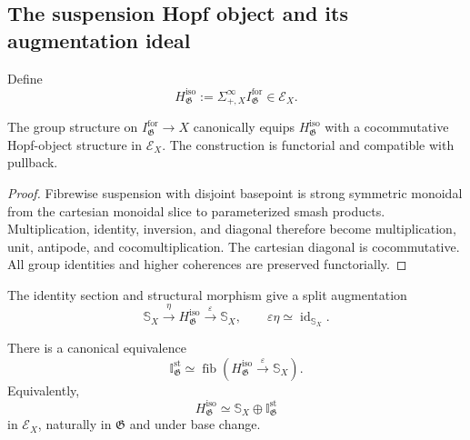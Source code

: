 \subsection{The suspension Hopf object and its augmentation ideal}

\begin{definition}
\label{def:bnla-isotropy-hopf}
Define
\[
    H^{\mathrm{iso}}_{\mathfrak G}
    :=
    \Sigma^\infty_{+,X}
    I^{\mathrm{for}}_{\mathfrak G}
    \in\mathcal E_X.
\]
\end{definition}

\begin{proposition}
\label{prop:bnla-isotropy-hopf}
The group structure on $I^{\mathrm{for}}_{\mathfrak G}\to X$ canonically
equips $H^{\mathrm{iso}}_{\mathfrak G}$ with a cocommutative Hopf-object
structure in $\mathcal E_X$.  The construction is functorial and compatible
with pullback.
\end{proposition}

\begin{proof}
Fibrewise suspension with disjoint basepoint is strong symmetric monoidal from
the cartesian monoidal slice to parameterized smash products.  Multiplication,
identity, inversion, and diagonal therefore become multiplication, unit,
antipode, and cocomultiplication.  The cartesian diagonal is cocommutative.
All group identities and higher coherences are preserved functorially.
\end{proof}

The identity section and structural morphism give a split augmentation
\[
    \mathbb S_X
    \xrightarrow{\eta}
    H^{\mathrm{iso}}_{\mathfrak G}
    \xrightarrow{\varepsilon}
    \mathbb S_X,
    \qquad
    \varepsilon\eta\simeq\operatorname{id}_{\mathbb S_X}.
\]

\begin{theorem}
\label{thm:bnla-isotropy-augmentation-ideal}
There is a canonical equivalence
\[
    \boxed{
    \mathbb I^{\mathrm{st}}_{\mathfrak G}
    \simeq
    \operatorname{fib}
    \left(
        H^{\mathrm{iso}}_{\mathfrak G}
        \xrightarrow{\varepsilon}
        \mathbb S_X
    \right).}
\]
Equivalently,
\[
    H^{\mathrm{iso}}_{\mathfrak G}
    \simeq
    \mathbb S_X\oplus
    \mathbb I^{\mathrm{st}}_{\mathfrak G}
\]
in $\mathcal E_X$, naturally in $\mathfrak G$ and under base change.
\end{theorem}

